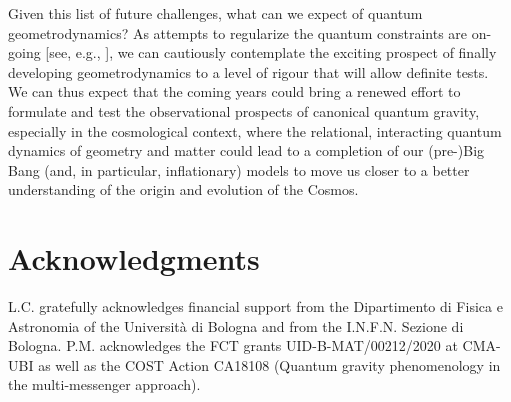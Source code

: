 \documentclass[12pt]{iopart}
\begin{document}
Given this list of future challenges, what can we expect of quantum geometrodynamics? As attempts to regularize the quantum constraints are on-going [see, e.g., \citet{Hamber:2011cn,Feng:2018cul,Lang:2023lad,Lang:2023ugj}], we can cautiously contemplate the exciting prospect of finally developing geometrodynamics to a level of rigour that will allow definite tests. We can thus expect that the coming years could bring a renewed effort to formulate and test the observational prospects of canonical quantum gravity, especially in the cosmological context, where the relational, interacting quantum dynamics of geometry and matter could lead to a completion of our (pre-)Big Bang (and, in particular, inflationary) models to move us closer to a better understanding of the origin and evolution of the Cosmos.

\section*{Acknowledgments}
L.C. gratefully acknowledges financial support from the Dipartimento di Fisica e Astronomia of the Universit\`{a} di Bologna and from the I.N.F.N. Sezione di Bologna. P.M. acknowledges the FCT grants UID-B-MAT/00212/2020 at CMA-UBI as well as  the COST Action CA18108 (Quantum gravity phenomenology in the multi-messenger approach).

\newcommand{\newblock}{\ } %
\end{document}
